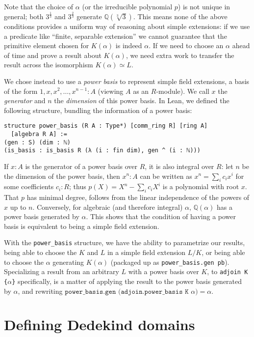 \documentclass[a4paper,USenglish,cleveref, autoref, thm-restate]{lipics-v2021}
\newcommand{\lean}[1]{\texttt{#1}\xspace} %
\newcommand{\Q}{\mathbb{Q}}
\begin{document}
Note that the choice of $\alpha$ (or the irreducible polynomial $p$) is not unique in general; both $3^\frac{1}{3}$ and $3^\frac{2}{3}$ generate $\Q(\sqrt[3]{3})$.
This means none of the above conditions provides a uniform way of reasoning about simple extensions:
if we use a predicate like ``finite, separable extension'' we cannot guarantee that the primitive element chosen for $K(\alpha)$ is indeed $\alpha$.
If we need to choose an $\alpha$ ahead of time and prove a result about $K(\alpha)$, we need extra work to transfer the result across the isomorphism $K(\alpha) \simeq L$.

We chose instead to use a \emph{power basis} to represent simple field extensions, a basis of the form $1, x, x^2, \dots, x^{n-1} : A$ (viewing $A$ as an $R$-module).
We call $x$ the \emph{generator} and $n$ the \emph{dimension} of this power basis.
In Lean, we defined the following structure, bundling the information of a power basis:
\begin{lstlisting}
structure power_basis (R A : Type*) [comm_ring R] [ring A]
  [algebra R A] :=
(gen : S) (dim : ℕ)
(is_basis : is_basis R (λ (i : fin dim), gen ^ (i : ℕ)))
\end{lstlisting}

If $x : A$ is the generator of a power basis over $R$, it is also integral over $R$:
let $n$ be the dimension of the power basis, then $x^n : A$ can be written as $x^n = \sum_i c_i x^i$ for some coefficients $c_i : R$;
thus $p(X) = X^n - \sum_i c_i X^i$ is a polynomial with root $x$.
That $p$ has minimal degree, follows from the linear independence of the powers of $x$ up to $n$.
Conversely, for algebraic (and therefore integral) $\alpha$, $\Q(\alpha)$ has a power basis generated by $\alpha$.
This shows that the condition of having a power basis is equivalent to being a simple field extension.

With the \lean{power\_basis} structure, we have the ability to parametrize our results,
being able to choose the $K$ and $L$ in a simple field extension $L / K$,
or being able to choose the $\alpha$ generating $K(\alpha)$ (packaged up as \lean{power\_basis.gen\ pb}).
Specializing a result from an arbitrary $L$ with a power basis over $K$, to \lean{adjoin K \{$\alpha$\}} specifically, is a matter of applying the result to the power basis generated by $\alpha$, and rewriting $\lean{power\_basis.gen (adjoin.power\_basis K $\alpha$)} = \alpha$.


\section{Defining Dedekind domains} \label{sec:Dedekind-domain}
\end{document}
